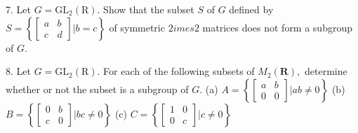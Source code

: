 \newpage
\begin{mdframed}[style=darkQuesion]
  7. Let $G=\mathrm{GL}_{2}(\mathrm{R}) .$ Show that the subset $S$ of $G$ defined by $S=\left\{\left[\begin{array}{ll}a & b \\ c & d\end{array}\right] | b=c\right\}$ of symmetric $2   imes 2$ matrices does not form a subgroup of $G .$
    
\end{mdframed}

\begin{mdframed}[style=darkAnswer,frametitle={Joe Starr}]
    
\end{mdframed}
\newpage
\begin{mdframed}[style=darkQuesion]
  8. Let $G=\mathrm{GL}_{2}(\mathrm{R}) .$ For each of the following subsets of $M_{2}(\mathbf{R}),$ determine whether
  or not the subset is a subgroup of $G .$
  (a) $A=\left\{\left[\begin{array}{ll}a & b \\ 0 & 0\end{array}\right] | a b \neq 0\right\}$
  (b) $B=\left\{\left[\begin{array}{ll}0 & b \\ c & 0\end{array}\right] | b c \neq 0\right\}$
  (c) $C=\left\{\left[\begin{array}{ll}1 & 0 \\ 0 & c\end{array}\right] | c \neq 0\right\}$
    
\end{mdframed}

